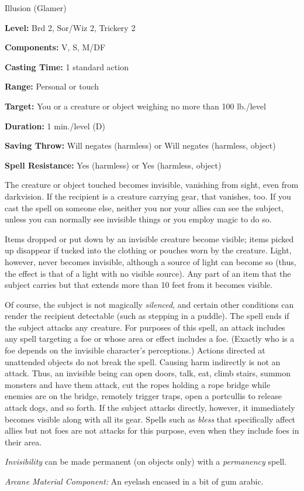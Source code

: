 
Illusion (Glamer)

\textbf{Level:} Brd 2, Sor/Wiz 2, Trickery 2

\textbf{Components:} V, S, M/DF

\textbf{Casting Time:} 1 standard action

\textbf{Range:} Personal or touch

\textbf{Target:} You or a creature or object weighing no more than 100 lb./level

\textbf{Duration:} 1 min./level (D)

\textbf{Saving Throw:} Will negates (harmless) or Will negates (harmless, object)

\textbf{Spell Resistance:} Yes (harmless) or Yes (harmless, object)

The creature or object touched becomes invisible, vanishing from sight, even from 
darkvision. If the recipient is a creature carrying gear, that vanishes, too. If 
you cast the spell on someone else, neither you nor your allies can see the subject, 
unless you can normally see invisible things or you employ magic to do so.

Items dropped or put down by an invisible creature become visible; items picked 
up disappear if tucked into the clothing or pouches worn by the creature. Light, 
however, never becomes invisible, although a source of light can become so (thus, 
the effect is that of a light with no visible source). Any part of an item that 
the subject carries but that extends more than 10 feet from it becomes visible.

Of course, the subject is not magically \textit{silenced}, and certain other conditions 
can render the recipient detectable (such as stepping in a puddle). The spell ends 
if the subject attacks any creature. For purposes of this spell, an attack includes 
any spell targeting a foe or whose area or effect includes a foe. (Exactly who 
is a foe depends on the invisible character's perceptions.) Actions directed at 
unattended objects do not break the spell. Causing harm indirectly is not an attack. 
Thus, an invisible being can open doors, talk, eat, climb stairs, summon monsters 
and have them attack, cut the ropes holding a rope bridge while enemies are on 
the bridge, remotely trigger traps, open a portcullis to release attack dogs, and 
so forth. If the subject attacks directly, however, it immediately becomes visible 
along with all its gear. Spells such as \textit{bless} that specifically affect 
allies but not foes are not attacks for this purpose, even when they include foes 
in their area.

\textit{Invisibility} can be made permanent (on objects only) with a \textit{permanency 
}spell.

\textit{Arcane Material Component:} An eyelash encased in a bit of gum arabic.

